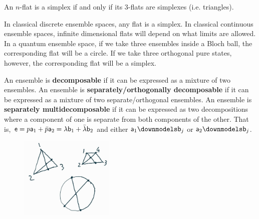 \begin{conj}
	An $n$-flat is a simplex if and only if its $3$-flats are simplexes (i.e. triangles).
\end{conj}

\begin{remark}
	In classical discrete ensemble spaces, any flat is a simplex. In classical continuous ensemble spaces, infinite dimensional flats will depend on what limits are allowed. In a quantum ensemble space, if we take three ensembles inside a Bloch ball, the corresponding flat will be a circle. If we take three orthogonal pure states, however, the corresponding flat will be a simplex.
\end{remark}

\begin{defn}
	An ensemble is \textbf{decomposable} if it can be expressed as a mixture of two ensembles. An ensemble is \textbf{separately/orthogonally decomposable} if it can be expressed as a mixture of two separate/orthogonal ensembles. An ensemble is \textbf{separately multidecomposable} if it can be expressed as two decompositions where a component of one is separate from both components of the other. That is, $\ens = p \ens[a]_1 + \bar{p} \ens[a]_2 = \lambda \ens[b]_1 +\bar{\lambda} \ens[b]_2$ and either $\ens[a]_1 \separate \ens[b]_j$ or $\ens[a]_2 \separate \ens[b]_j$.
\end{defn}

\begin{figure}[h]
	\centering
	\includegraphics[width=0.4\textwidth]{tempimages/MultipleDecomposition.jpg}
\end{figure}


